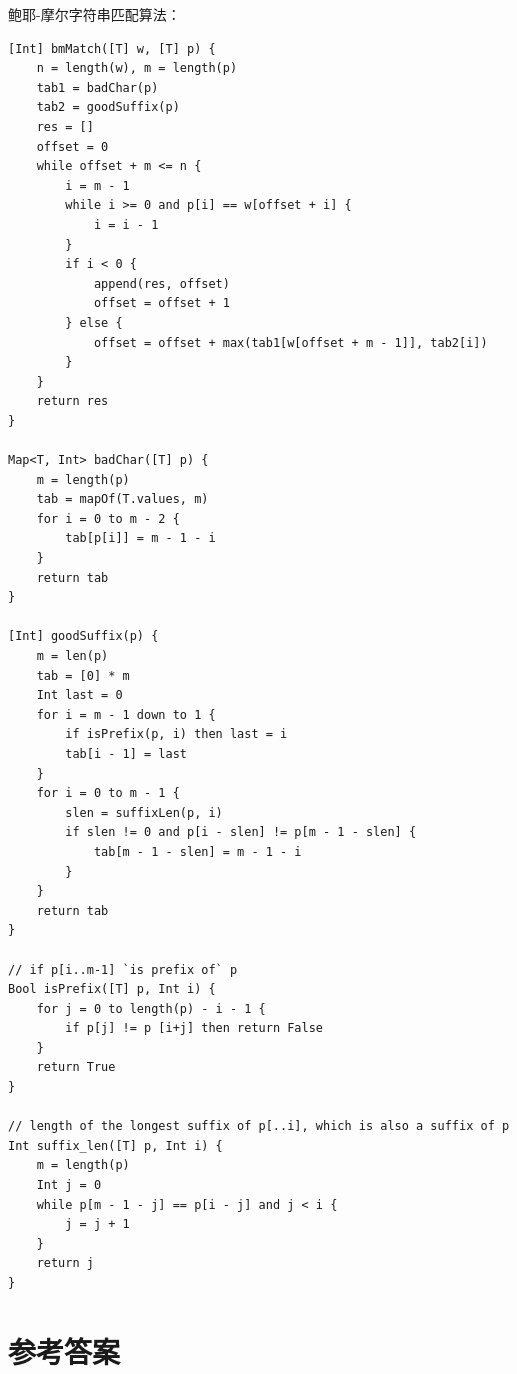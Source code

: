 \documentclass[b5paper]{ctexart}
\begin{document}
鲍耶-摩尔字符串匹配算法：

\begin{lstlisting}[language = Bourbaki]
[Int] bmMatch([T] w, [T] p) {
    n = length(w), m = length(p)
    tab1 = badChar(p)
    tab2 = goodSuffix(p)
    res = []
    offset = 0
    while offset + m <= n {
        i = m - 1
        while i >= 0 and p[i] == w[offset + i] {
            i = i - 1
        }
        if i < 0 {
            append(res, offset)
            offset = offset + 1
        } else {
            offset = offset + max(tab1[w[offset + m - 1]], tab2[i])
        }
    }
    return res
}

Map<T, Int> badChar([T] p) {
    m = length(p)
    tab = mapOf(T.values, m)
    for i = 0 to m - 2 {
        tab[p[i]] = m - 1 - i
    }
    return tab
}

[Int] goodSuffix(p) {
    m = len(p)
    tab = [0] * m
    Int last = 0
    for i = m - 1 down to 1 {
        if isPrefix(p, i) then last = i
        tab[i - 1] = last
    }
    for i = 0 to m - 1 {
        slen = suffixLen(p, i)
        if slen != 0 and p[i - slen] != p[m - 1 - slen] {
            tab[m - 1 - slen] = m - 1 - i
        }
    }
    return tab
}

// if p[i..m-1] `is prefix of` p
Bool isPrefix([T] p, Int i) {
    for j = 0 to length(p) - i - 1 {
        if p[j] != p [i+j] then return False
    }
    return True
}

// length of the longest suffix of p[..i], which is also a suffix of p
Int suffix_len([T] p, Int i) {
    m = length(p)
    Int j = 0
    while p[m - 1 - j] == p[i - j] and j < i {
        j = j + 1
    }
    return j
}
\end{lstlisting}

\ifx\wholebook\relax\else
\section{参考答案}
\shipoutAnswer
\end{document}
